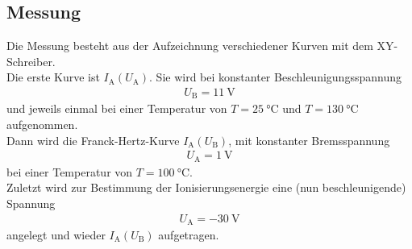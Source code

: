 \clearpage

\subsection{Messung}
Die Messung besteht aus der Aufzeichnung verschiedener Kurven mit dem XY-Schreiber. \\
Die erste Kurve ist $I_\text{A}(U_\text{A})$. Sie wird bei konstanter Beschleunigungsspannung
\begin{align}
	U_\text{B} = \SI{11}{\volt}
\end{align}
und jeweils einmal bei einer Temperatur von $T=\SI{25}{\celsius}$ und $T=\SI{130}{\celsius}$ aufgenommen. \\
Dann wird die Franck-Hertz-Kurve $I_\text{A}(U_\text{B})$, mit konstanter Bremsspannung
\begin{align}
	U_\text{A} = \SI{1}{\volt}
\end{align}
bei einer Temperatur von $T = \SI{100}{\celsius}$. \\
Zuletzt wird zur Bestimmung der Ionisierungsenergie eine (nun beschleunigende) Spannung
\begin{align}
	U_\text{A} = \SI{-30}{\volt}
\end{align}
angelegt und wieder $I_\text{A}(U_\text{B})$ aufgetragen.